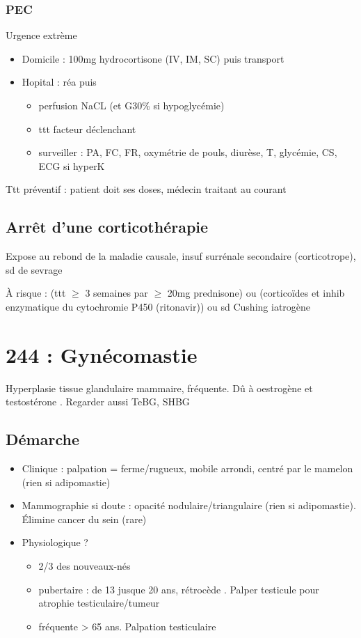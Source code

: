 \documentclass[11pt]{article}
\begin{document}
\subsubsection{PEC}
\label{sec:orgd4a1f98}
\danger Urgence extrème \skull
\begin{itemize}
\item Domicile : 100mg hydrocortisone (IV, IM, SC) puis transport
\item Hopital : réa puis 
\begin{itemize}
\item perfusion NaCL (et G30\% si hypoglycémie)
\item ttt facteur déclenchant
\item surveiller : PA, FC, FR, oxymétrie de pouls, diurèse, T, glycémie, CS, ECG
si hyperK
\end{itemize}
\end{itemize}

Ttt préventif : patient doit \inc ses doses, médecin traitant au courant

\subsection{Arrêt d'une corticothérapie}
\label{sec:org97136a2}
Expose au rebond de la maladie causale, insuf surrénale secondaire
(corticotrope), sd de sevrage

À risque : (ttt \(\ge\) 3 semaines par \(\ge\) 20mg prednisone) ou (corticoïdes et inhib enzymatique du
cytochromie P450 (ritonavir)) ou sd Cushing iatrogène
\section{244 : Gynécomastie}
\label{sec:orgff81974}
Hyperplasie tissue glandulaire mammaire, fréquente. Dû à oestrogène \inc{} et testostérone \dec{}. Regarder aussi TeBG,
SHBG
\subsection{Démarche}
\label{sec:org4ccd225}
\begin{itemize}
\item Clinique : palpation = ferme/rugueux, mobile arrondi, centré par le mamelon (rien si adipomastie)
\item Mammographie si doute : opacité nodulaire/triangulaire (rien si adipomastie). Élimine cancer du sein (rare)
\item Physiologique ? 
\begin{itemize}
\item 2/3 des nouveaux-nés
\item pubertaire : de 13 jusque 20 ans, rétrocède . Palper testicule pour atrophie testiculaire/tumeur
\item fréquente > 65 ans. Palpation testiculaire
\end{itemize}
\end{itemize}
\end{document}
